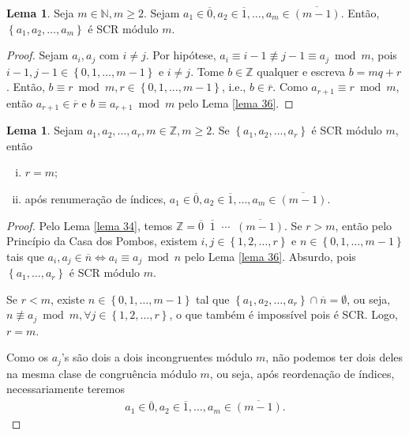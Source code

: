 \documentclass[a4paper,11pt,twoside, leqno]{article}
\theoremstyle{definition}
\newtheorem{lemma}[theorem]{Lema}
\begin{document}
\begin{lemma}
	\label{lema 38}
	Seja $m\in\mathbb{N}, m\geq 2$. Sejam $a_1\in\overline{0}, a_2\in\overline{1}, \dots, a_m\in\overline{(m-1)}$. Então, $\left\{a_1, a_2, \dots, a_m\right\}$ é SCR módulo $m$.
\end{lemma}
\begin{proof}
	Sejam $a_i,a_j$ com $i\neq j$. Por hipótese, $a_i\equiv i-1\not\equiv j-1\equiv a_j\bmod m$, pois $i-1,j-1\in\left\{0,1,\dots,m-1\right\}$ e $i\neq j$. Tome $b\in\mathbb{Z}$ qualquer e escreva $b=mq+r$. Então, $b\equiv r\bmod m, r\in\left\{0,1,\dots,m-1\right\}$, i.e., $b\in\overline{r}$. Como $a_{r+1}\equiv r\bmod m$, então $a_{r+1}\in\overline{r}$ e $b\equiv a_{r+1}\bmod m$ pelo Lema \eqref{lema 36}.
\end{proof}
\begin{lemma}
	\label{lema 39}
	Sejam $a_1, a_2, \dots, a_r,m\in\mathbb{Z}, m\geq 2$. Se $\left\{a_1, a_2, \dots, a_r\right\}$ é SCR módulo $m$, então
	\begin{enumerate}[(i)]
		\item $r=m$;
		\item após renumeração de índices, $a_1\in\overline{0}, a_2\in\overline{1}, \dots, a_m\in\overline{(m-1)}$.
	\end{enumerate}
\end{lemma}
\begin{proof}
	Pelo Lema \eqref{lema 34}, temos $\mathbb{Z} =\overline{0} \mathop{\dot\cup} \overline{1} \mathop{\dot\cup} \cdots \mathop{\dot\cup} \overline{(m-1)}$. Se $r>m$, então pelo Princípio da Casa dos Pombos, existem $i,j\in\left\{1,2,\dots,r\right\}$ e $n\in\left\{0,1,\dots,m-1\right\}$ tais que $a_i,a_j\in\overline{n}\Leftrightarrow a_i\equiv a_j\bmod n$ pelo Lema \eqref{lema 36}. Absurdo, pois $\left\{a_1,\dots,a_r\right\}$ é SCR módulo $m$. 
	
	Se $r<m$, existe $n\in\left\{0,1,\dots,m-1\right\}$ tal que $\left\{a_1,a_2,\dots,a_r\right\}\cap\overline{n}=\emptyset$, ou seja, $n\not\equiv a_j\bmod m, \forall j\in\left\{1,2,\dots,r\right\}$, o que também é impossível pois é SCR. Logo, $r=m$.
	
	Como os $a_j$'s são dois a dois incongruentes módulo $m$, não podemos ter dois deles na mesma clase de congruência módulo $m$, ou seja, após reordenação de índices, necessariamente teremos
	\begin{align*}
	a_1\in\overline{0}, a_2\in\overline{1}, \dots, a_m\in\overline{(m-1)}.
	\end{align*}
\end{proof}
\end{document}
